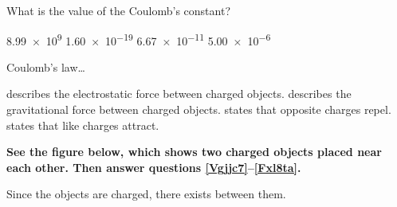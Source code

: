 \documentclass{exam}
\begin{document}
\begin{questions}
\question
What is the value of the Coulomb's constant?

\begin{randomizechoices}
    \correctchoice \num{8.99e9}
    \choice \num{1.60e-19}
    \choice \num{6.67e-11}
    \choice \num{5.00e-6}
\end{randomizechoices}

\question
Coulomb's law\ldots

\begin{randomizechoices}
    \correctchoice describes the electrostatic force between charged objects.
    \choice describes the gravitational force between charged objects.
    \choice states that opposite charges repel.
    \choice states that like charges attract.
\end{randomizechoices}
\vspace{1em}
\cyanhrule

\clearpage
\begin{EnvUplevel}
\textbf{See the figure below, which shows two charged objects placed near each other. Then answer questions \ref{Vgjjc7}--\ref{Fxl8ta}.}
\end{EnvUplevel}

\vspace{-1em}


\def\distanceA{5}
\def\distanceR{3}

\begin{center}
\end{center}

\question \label{Vgjjc7}
Since the objects are charged, there exists \fillin[][5cm] between them.


\end{questions}
\end{document}
